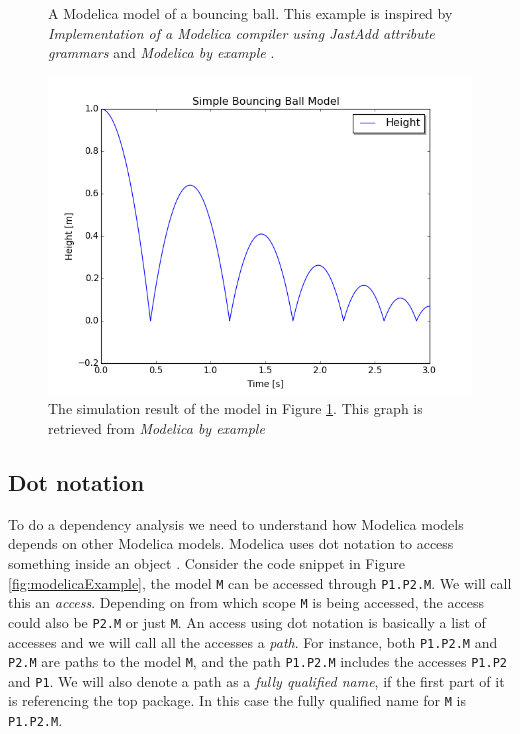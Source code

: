 \documentclass{cslthse-msc}
\begin{document}
\begin{figure}[!htbp]
    \centering
    
    \caption{A Modelica model of a bouncing ball. This example is inspired by \textit{Implementation of a Modelica compiler using JastAdd attribute grammars} \cite{aakesson2010implementation} and \textit{Modelica by example} \cite{tillermodelica}.}
    \label{fig:bouncingBallCode}
\end{figure}

\begin{figure}[!htbp]
    \centering
    \vspace{-0.5cm}
    \includegraphics[width=1.0\textwidth]{Pictures/BB1.png}
    \caption{The simulation result of the model in Figure \ref{fig:bouncingBallCode}. This graph is retrieved from \textit{Modelica by example} \cite{tillermodelica}}
    \label{fig:bouncingBallSimulation}
\end{figure}

\subsection{Dot notation}
To do a dependency analysis we need to understand how Modelica models depends on other Modelica models. Modelica uses dot notation to access something inside an object \cite{modelicamodelica}. Consider the code snippet in Figure \ref{fig:modelicaExample}, the model \texttt{M} can be accessed through \texttt{P1.P2.M}. We will call this an \emph{access}. Depending on from which scope \texttt{M} is being accessed, the access could also be \texttt{P2.M} or just \texttt{M}. An access using dot notation is basically a list of accesses and we will call all the accesses a \emph{path}. For instance, both \texttt{P1.P2.M} and \texttt{P2.M} are paths to the model \texttt{M}, and the path \texttt{P1.P2.M} includes the accesses \texttt{P1.P2} and \texttt{P1}. We will also denote a path as a \emph{fully qualified name}, if the first part of it is referencing the top package. In this case the fully qualified name for \texttt{M} is \texttt{P1.P2.M}.
\end{document}
